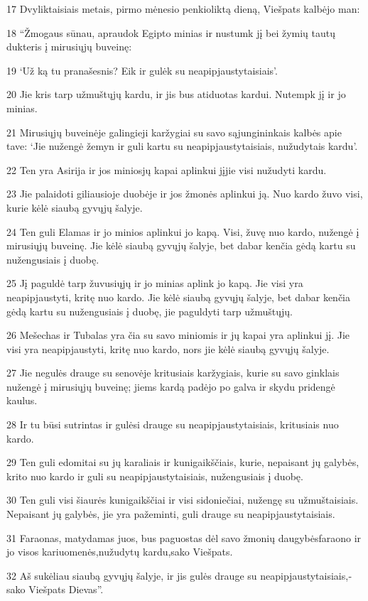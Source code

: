 \par 17 Dvyliktaisiais metais, pirmo mėnesio penkioliktą dieną, Viešpats kalbėjo man: 
\par 18 “Žmogaus sūnau, apraudok Egipto minias ir nustumk jį bei žymių tautų dukteris į mirusiųjų buveinę: 
\par 19 ‘Už ką tu pranašesnis? Eik ir gulėk su neapipjaustytaisiais’. 
\par 20 Jie kris tarp užmuštųjų kardu, ir jis bus atiduotas kardui. Nutempk jį ir jo minias. 
\par 21 Mirusiųjų buveinėje galingieji karžygiai su savo sąjungininkais kalbės apie tave: ‘Jie nužengė žemyn ir guli kartu su neapipjaustytaisiais, nužudytais kardu’. 
\par 22 Ten yra Asirija ir jos minios­jų kapai aplinkui jį­jie visi nužudyti kardu. 
\par 23 Jie palaidoti giliausioje duobėje ir jos žmonės aplinkui ją. Nuo kardo žuvo visi, kurie kėlė siaubą gyvųjų šalyje. 
\par 24 Ten guli Elamas ir jo minios aplinkui jo kapą. Visi, žuvę nuo kardo, nužengė į mirusiųjų buveinę. Jie kėlė siaubą gyvųjų šalyje, bet dabar kenčia gėdą kartu su nužengusiais į duobę. 
\par 25 Jį paguldė tarp žuvusiųjų ir jo minias aplink jo kapą. Jie visi yra neapipjaustyti, kritę nuo kardo. Jie kėlė siaubą gyvųjų šalyje, bet dabar kenčia gėdą kartu su nužengusiais į duobę, jie paguldyti tarp užmuštųjų. 
\par 26 Mešechas ir Tubalas yra čia su savo miniomis ir jų kapai yra aplinkui jį. Jie visi yra neapipjaustyti, kritę nuo kardo, nors jie kėlė siaubą gyvųjų šalyje. 
\par 27 Jie negulės drauge su senovėje kritusiais karžygiais, kurie su savo ginklais nužengė į mirusiųjų buveinę; jiems kardą padėjo po galva ir skydu pridengė kaulus. 
\par 28 Ir tu būsi sutrintas ir gulėsi drauge su neapipjaustytaisiais, kritusiais nuo kardo. 
\par 29 Ten guli edomitai su jų karaliais ir kunigaikščiais, kurie, nepaisant jų galybės, krito nuo kardo ir guli su neapipjaustytaisiais, nužengusiais į duobę. 
\par 30 Ten guli visi šiaurės kunigaikščiai ir visi sidoniečiai, nužengę su užmuštaisiais. Nepaisant jų galybės, jie yra pažeminti, guli drauge su neapipjaustytaisiais. 
\par 31 Faraonas, matydamas juos, bus paguostas dėl savo žmonių daugybės­faraono ir jo visos kariuomenės,­nužudytų kardu,­sako Viešpats.­ 
\par 32 Aš sukėliau siaubą gyvųjų šalyje, ir jis gulės drauge su neapipjaustytaisiais,­sako Viešpats Dievas”.



